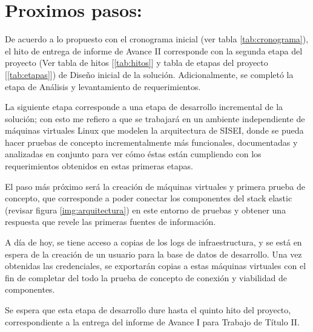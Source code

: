\section{Proximos pasos:}

De acuerdo a lo propuesto con el cronograma inicial (ver tabla \ref{tab:cronograma}), el hito de entrega de informe de Avance II corresponde con la segunda etapa del proyecto (Ver tabla de hitos [\ref{tab:hitos}] y tabla de etapas del proyecto [\ref{tab:etapas}]) de Diseño inicial de la solución. Adicionalmente, se completó la etapa de Análisis y levantamiento de requerimientos.

La siguiente etapa corresponde a una etapa de desarrollo incremental de la solución; con esto me refiero a que se trabajará en un ambiente independiente de máquinas virtuales Linux que modelen la arquitectura de SISEI, donde se pueda hacer pruebas de concepto incrementalmente más funcionales, documentadas y analizadas en conjunto para ver cómo éstas están cumpliendo con los requerimientos obtenidos en estas primeras etapas.

El paso más próximo será la creación de máquinas virtuales y primera prueba de concepto, que corresponde a poder conectar los componentes del stack elastic (revisar figura \ref{img:arquitectura}) en este entorno de pruebas y obtener una respuesta que revele las primeras fuentes de información.

A día de hoy, se tiene acceso a copias de los logs de infraestructura, y se está en espera de la creación de un usuario para la base de datos de desarrollo. Una vez obtenidas las credenciales, se exportarán copias a estas máquinas virtuales con el fin de completar del todo la prueba de concepto de conexión y viabilidad de componentes.

Se espera que esta etapa de desarrollo dure hasta el quinto hito del proyecto, correspondiente a la entrega del informe de Avance I para Trabajo de Título II.

\clearpage
